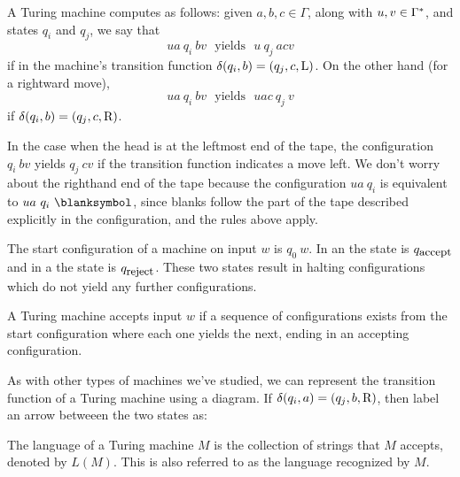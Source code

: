 \documentclass[twoside,letterpaper,openany]{book}
\begin{document}
\begin{defn}
A Turing machine computes as follows: given $a, b, c \in \Gamma$, along with $u, v \in \Gamma^{*}$, and states $q_i$ and $q_j$, we say that 
\[ ua~q_i~bv  ~~~\textrm{yields}~~~ u~q_j~acv \]
if in the machine's transition function $\delta(q_i, b) = (q_j, c, \textrm{L})$. On the other hand (for a rightward move), 
\[ ua~q_i~bv  ~~~\textrm{yields}~~~ uac~q_j~v \]
if $\delta(q_i, b) = (q_j, c, \textrm{R})$.

In the case when the head is at the leftmost end of the tape, the configuration $q_i~bv$  yields $q_j~cv$ if the transition function indicates a move left. We don't worry about the righthand end of the tape because the configuration $ua~q_i$ is equivalent to $ua~q_i~\blanksymbol$, since blanks follow the part of the tape described explicitly in the configuration, and the rules above apply.

The start configuration of a machine on input $w$ is $q_0~w$. In an  the state is $q_\textrm{\small accept}$ and in a  the state is $q_\textrm{\small reject}$. These two states result in halting configurations which do not yield any further configurations.

A Turing machine accepts input $w$ if a sequence of configurations exists from the start configuration where each one yields the next, ending in an accepting configuration.
\end{defn}

\begin{discussion}
As with other types of machines we've studied, we can represent the transition function of a Turing machine using a diagram. If $\delta(q_i, a) = (q_j, b, \textrm{R})$, then label an arrow betweeen the two states as:
\begin{center}
\end{center}
\end{discussion}


\begin{defn}
The language of a Turing machine $M$ is the collection of strings that $M$ accepts, denoted by $L(M)$. This is also referred to as the language recognized by $M$.
\end{defn}
\end{document}
